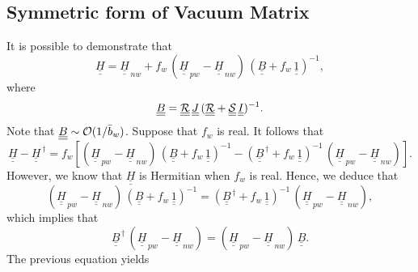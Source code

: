 \documentclass[12pt,prb,aps,notitlepage]{revtex4-1}
\begin{document}
\subsection{Symmetric form of Vacuum Matrix}
It is possible to demonstrate that
\begin{equation}\label{e130}
\underline{\underline{H}} = \underline{\underline{H}}_{\,nw} + f_w\,( \underline{\underline{H}}_{\,pw} - \underline{\underline{H}}_{\,nw} )\,(\underline{\underline{B}}+f_w\,\underline{\underline{1}})^{-1},
\end{equation}
where
\begin{equation}
\underline{\underline{B}}= \underline{\underline{\cal R}}\,\underline{\underline{J}}\,(\underline{\underline{\cal R}} + \underline{\underline{\cal S}}\,\underline{\underline{I}})^{-1}.
\end{equation}
Note that $\underline{\underline{B}}\sim{\cal O}(1/\bar{b}_w)$. 
Suppose that $f_w$ is real. It follows that
\begin{equation}
\underline{\underline{H}} -\underline{\underline{H}}^{\,\dag} = 
f_w\left[( \underline{\underline{H}}_{\,pw} - \underline{\underline{H}}_{\,nw} )\,(\underline{\underline{B}}+f_w\,\underline{\underline{1}})^{-1}- (\underline{\underline{B}}^{\,\dag}+f_w\,
\underline{\underline{1}})^{-1}\,( \underline{\underline{H}}_{\,pw} - \underline{\underline{H}}_{\,nw} )
\right].
\end{equation}
However, we know that $\underline{\underline{H}}$ is Hermitian when $f_w$ is real. Hence, we deduce that
\begin{equation}\label{e133}
 (\underline{\underline{H}}_{\,pw} - \underline{\underline{H}}_{\,nw} )\,(\underline{\underline{B}}+f_w\,\underline{\underline{1}})^{-1}= (\underline{\underline{B}}^{\,\dag}+f_w\,
\underline{\underline{1}})^{-1}\,( \underline{\underline{H}}_{\,pw} - \underline{\underline{H}}_{\,nw} ),
\end{equation}
which implies that
\begin{equation}\label{e122}
\underline{\underline{B}}^{\,\dag}\,( \underline{\underline{H}}_{\,pw} - \underline{\underline{H}}_{\,nw} )= ( \underline{\underline{H}}_{\,pw} - \underline{\underline{H}}_{\,nw} )\,\underline{\underline{B}}.
\end{equation}
The previous equation yields
\end{document}
